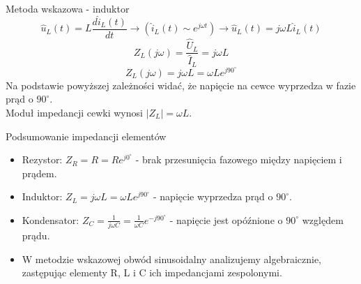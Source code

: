 \begin{frame}{Metoda wskazowa - induktor}
	\begin{equation*}
		\hat{u}_L(t) = L \frac{d \hat{i}_L(t)}{dt} \rightarrow \left( \hat{i}_L(t) \sim e^{j\omega t} \right) \rightarrow \hat{u}_L(t) = j \omega L \hat{i}_L(t)
	\end{equation*}
	\begin{equation*}
		Z_L(j \omega) = \frac{\hat{U}_L}{\hat{I}_L} = j \omega L
	\end{equation*}
	\begin{equation*}
		Z_L(j \omega) = j \omega L = \omega L e^{j90^{\circ}}
	\end{equation*}
	Na podstawie powyższej zależności widać, że napięcie na cewce wyprzedza w fazie prąd o $90^{\circ}$.\\
	Moduł impedancji cewki wynosi $\left| Z_L \right| = \omega L$.
\end{frame}

\begin{frame}{Podsumowanie impedancji elementów}
	\begin{itemize}
		\item[\bt] Rezystor: $Z_R = R = R e^{j0^{\circ}}$ - brak przesunięcia fazowego między napięciem i prądem.
		\item[\bt] Induktor: $Z_L = j \omega L = \omega L e^{j90^{\circ}}$ - napięcie wyprzedza prąd o $90^{\circ}$.
		\item[\bt] Kondensator: $Z_C = \frac{1}{j \omega C} = \frac{1}{\omega C} e^{-j90^{\circ}}$ - napięcie jest opóźnione o $90^{\circ}$ względem prądu.
		\item[\bt] W metodzie wskazowej obwód sinusoidalny analizujemy algebraicznie, zastępując elementy R, L i C ich impedancjami zespolonymi.
	\end{itemize}
\end{frame}